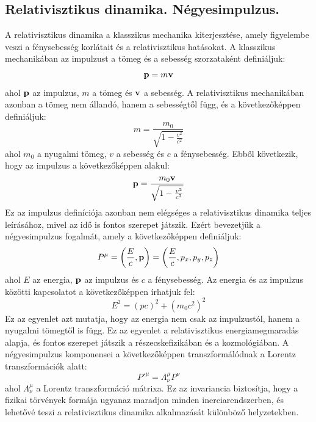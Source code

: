 \documentclass[../main.tex]{subfiles}
\begin{document}
\subsection{Relativisztikus dinamika. Négyesimpulzus.}
A relativisztikus dinamika a klasszikus mechanika kiterjesztése, amely figyelembe veszi a fénysebesség korlátait és a relativisztikus hatásokat. A klasszikus mechanikában az impulzust a tömeg és a sebesség szorzataként definiáljuk:
\begin{equation}
    \bold{p} = m \bold{v}
\end{equation}
ahol $\bold{p}$ az impulzus, $m$ a tömeg és $\bold{v}$ a sebesség. A relativisztikus mechanikában azonban a tömeg nem állandó, hanem a sebességtől függ, és a következőképpen definiáljuk:
\begin{equation}
    m = \frac{m_0}{\sqrt{1 - \frac{v^2}{c^2}}}
\end{equation}
ahol $m_0$ a nyugalmi tömeg, $v$ a sebesség és $c$ a fénysebesség. Ebből következik, hogy az impulzus a következőképpen alakul:
\begin{equation}
    \bold{p} = \frac{m_0 \bold{v}}{\sqrt{1 - \frac{v^2}{c^2}}}
\end{equation}
Ez az impulzus definíciója azonban nem elégséges a relativisztikus dinamika teljes leírásához, mivel az idő is fontos szerepet játszik. Ezért bevezetjük a négyesimpulzus fogalmát, amely a következőképpen definiáljuk:
\begin{equation}
    P^\mu = \left(\frac{E}{c}, \bold{p}\right) = \left(\frac{E}{c}, p_x, p_y, p_z\right)
\end{equation}
ahol $E$ az energia, $\bold{p}$ az impulzus és $c$ a fénysebesség. Az energia és az impulzus közötti kapcsolatot a következőképpen írhatjuk fel:
\begin{equation}
    E^2 = (pc)^2 + (m_0 c^2)^2
\end{equation}
Ez az egyenlet azt mutatja, hogy az energia nem csak az impulzustól, hanem a nyugalmi tömegtől is függ. Ez az egyenlet a relativisztikus energiamegmaradás alapja, és fontos szerepet játszik a részecskefizikában és a kozmológiában.
A négyesimpulzus komponensei a következőképpen transzformálódnak a Lorentz transzformációk alatt:
\begin{equation}
    P'^\mu = \Lambda^\mu_\nu P^\nu
\end{equation}
ahol $\Lambda^\mu_\nu$ a Lorentz transzformáció mátrixa. Ez az invariancia biztosítja, hogy a fizikai törvények formája ugyanaz maradjon minden inerciarendszerben, és lehetővé teszi a relativisztikus dinamika alkalmazását különböző helyzetekben.
\end{document}
